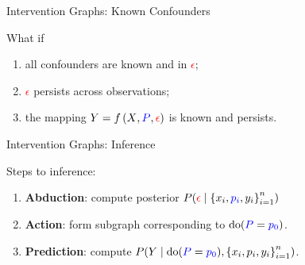 \documentclass[xcolor={dvipsnames}]{beamer}
\newcommand{\policy}{\mbox{\textcolor{blue}{$P$}}}
\newcommand{\response}{\mbox{\textcolor{black}{$Y$}}}
\newcommand{\confounder}{\mbox{\textcolor{red}{$\epsilon$}}}
\newcommand{\features}{\mbox{\textcolor{black}{$X$}}}
\begin{document}
    \begin{frame}{Intervention Graphs: Known Confounders}

        \begin{figure}
            \centering
            
        \end{figure}

        What if
        \begin{enumerate}
            \item all confounders are known and in \confounder{};
            \item \confounder{} persists across observations;
            \item the mapping \( \response{} = f\,(\features{}, \policy{}, \confounder{})\) is known and persists.
        \end{enumerate}

    \end{frame}

    \begin{frame}{Intervention Graphs: Inference}

        \begin{figure}
            \centering
            
        \end{figure}

        Steps to inference:
        \begin{enumerate}
            \item \textbf{Abduction}: compute posterior \( P(\confounder{} \mid \cbr{x_i, \textcolor{blue}{p_i}, y_i}_{i=1}^n) \)
            \item \textbf{Action}: form subgraph corresponding to \( \text{do}(\policy{} = \textcolor{blue}{p_0}) \).
            \item \textbf{Prediction}: compute \( P(Y \mid \text{do}(\policy{} = \textcolor{blue}{p_0}), \cbr{x_i, p_i, y_i}_{i=1}^n) \).
        \end{enumerate}

    \end{frame}
\end{document}
